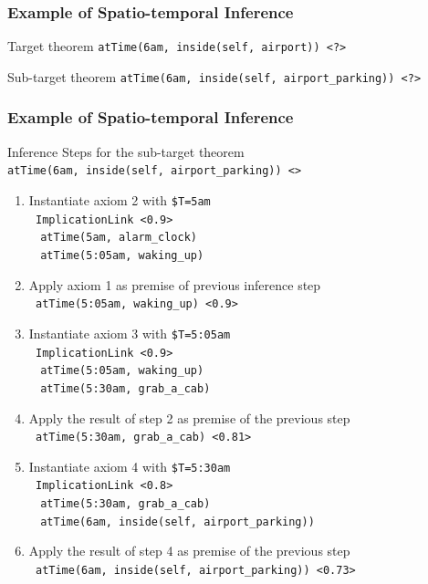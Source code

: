 \documentclass{beamer}
\begin{document}
\frame
{
  \frametitle{Example of Spatio-temporal Inference}

  \begin{beamerboxesrounded}{Target theorem}
    {\tt atTime(6am, inside(self, airport)) <?>}
  \end{beamerboxesrounded}
  
  \pause

  \begin{beamerboxesrounded}{Sub-target theorem}
    {\tt atTime(6am, inside(self, airport\_parking)) <?>}
  \end{beamerboxesrounded}
}

\frame
{
  \frametitle{Example of Spatio-temporal Inference}

  \begin{beamerboxesrounded}{Inference Steps for the \alert{sub-target theorem}\\
      {\scriptsize
        {\tt atTime(6am, inside(self, airport\_parking))
          <>}}
    }
  {\tiny
  \begin{enumerate}
  \item<+-> Instantiate axiom 2 with {\tt \$T=5am}\\
    {\tiny
    {\tt
    ImplicationLink <0.9>\\
    $\ \ \ \ $atTime(5am, alarm\_clock)\\
    $\ \ \ \ $atTime(5:05am, waking\_up)\\
    }
    }
  \item<+-> Apply axiom 1 as premise of previous inference step\\
    {\tiny
    {\tt
    atTime(5:05am, waking\_up) <0.9>\\
    }
    }
  \item<+-> Instantiate axiom 3 with {\tt \$T=5:05am}\\
    {\tiny
    {\tt
    ImplicationLink <0.9>\\
    $\ \ \ \ $atTime(5:05am, waking\_up)\\
    $\ \ \ \ $atTime(5:30am, grab\_a\_cab)\\
    }
    }
  \item<+-> Apply the result of step 2 as premise of the previous step\\
    {\tiny
    {\tt
    atTime(5:30am, grab\_a\_cab) <0.81>
    }
    }
  \item<+-> Instantiate axiom 4 with {\tt \$T=5:30am}\\
    {\tiny
    {\tt
    ImplicationLink <0.8>\\
    $\ \ \ \ $atTime(5:30am, grab\_a\_cab)\\
    $\ \ \ \ $atTime(6am, inside(self, airport\_parking))\\
    }
    }
  \item<+-> Apply the result of step 4 as premise of the previous step\\
    {\tiny
    {\tt
      \alert<7>{atTime(6am, inside(self, airport\_parking)) <0.73>}\\
    }
    }
  \end{enumerate}
  }
  \end{beamerboxesrounded}
}
\end{document}
